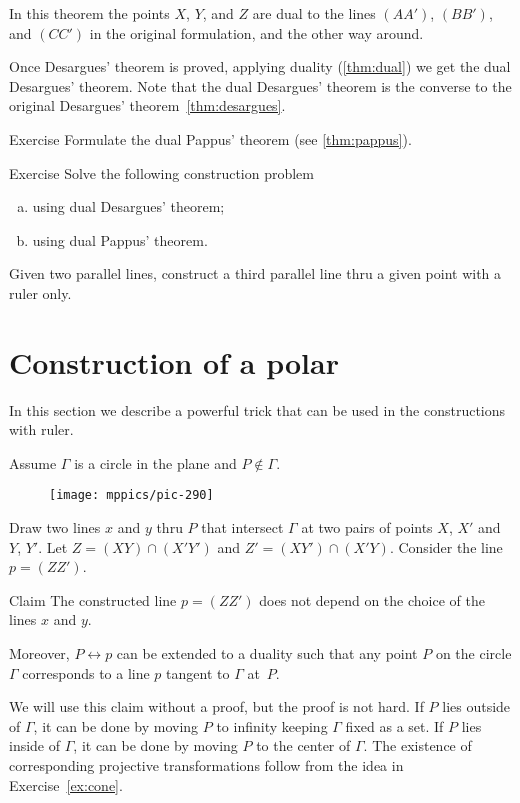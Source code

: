 In this theorem the points $X$, $Y$, and $Z$ 
are dual to the lines $(AA')$, $(BB')$, and $(CC')$ in the original formulation, and the other way around.

Once Desargues' theorem is proved, applying duality (\ref{thm:dual})
we get the dual Desargues' theorem.
Note that the dual Desargues' theorem is the converse to the original Desargues' theorem~\ref{thm:desargues}.

\begin{thm}{Exercise}\label{ex:dual-pappus}
Formulate the dual Pappus' theorem (see \ref{thm:pappus}).
\end{thm}

\begin{thm}{Exercise}\label{ex:dual-desargues-construction} 
Solve the following construction problem
\begin{enumerate}[(a)]
\item using dual Desargues' theorem;
\item using dual Pappus' theorem.
\end{enumerate}
Given two parallel lines, construct a third parallel line thru a given point with a ruler only.
\end{thm}

\section*{Construction of a polar}

In this section we describe a powerful trick that can be used in the constructions with ruler.

Assume $\Gamma$ is a circle in the plane and $P\notin \Gamma$.
\begin{figure}[h!]
\centering
\texttt{[image: mppics/pic-290]}
\end{figure}
Draw two lines $x$ and $y$ thru $P$ that intersect $\Gamma$ at two pairs of points $X$, $X'$ and $Y$, $Y'$.
Let $Z=(XY)\cap(X'Y')$ and $Z'=(XY')\cap(X'Y)$.
Consider the line $p=(ZZ')$.

\begin{thm}{Claim}\label{clm:polar}
The constructed line $p=(ZZ')$ does not depend on the choice of the lines $x$ and $y$.

Moreover, $P\leftrightarrow p$ can be extended to a duality such that any point $P$ on the circle $\Gamma$ corresponds to a line $p$ tangent to $\Gamma$ at~$P$. 
\end{thm}

We will use this claim without a proof, but the proof is not hard.
If $P$ lies outside of $\Gamma$, it can be done by moving $P$ to infinity keeping $\Gamma$ fixed as a set.
If $P$ lies inside of $\Gamma$, it can be done by moving $P$ to the center of $\Gamma$.
The existence of corresponding projective transformations follow from the idea in Exercise~\ref{ex:cone}.


